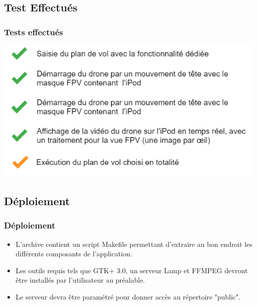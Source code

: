 \documentclass{beamer}
\begin{document}
	
	
	\begin{frame}
		\section{Test Effectués}
		\begin{center}
		\frametitle{Tests effectués}
           	\includegraphics[scale=0.5]{tests.png}
		\end{center}
	\end{frame}

	
	
	\begin{frame}
	\section{Déploiement}
		\begin{center}
		\frametitle{Déploiement}
		\begin{itemize}
	    \item	L'archive contient un script Makefile permettant d'extraire au bon endroit les différents composants de l'application.\\
	    \item	Les outils requis tels que GTK+ 3.0, un serveur Lamp et FFMPEG devront être installés par l'utilisateur au préalable.\\
	    \item	Le serveur devra être paramétré pour donner accès au répertoire "public".\\
		\end{itemize}
		\end{center}
	\end{frame}
	
\end{document}
